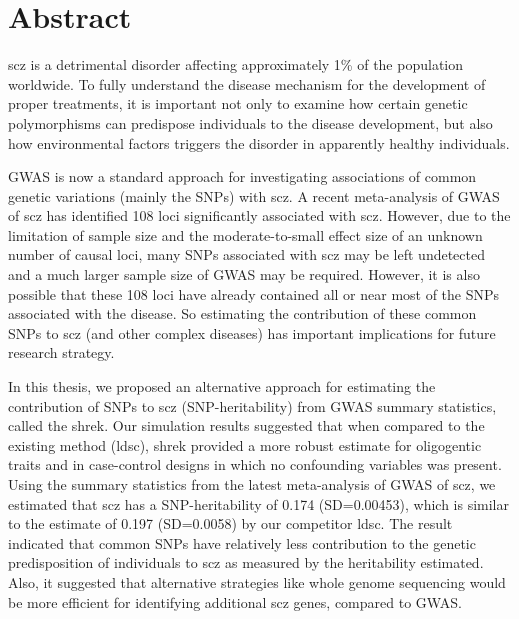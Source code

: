 \documentclass[12pt]{scrbook}
\begin{document}
	\chapter*{Abstract}
	\vspace{0.1cm}
	\Gls{scz} is a detrimental disorder affecting approximately 1\% of the population worldwide.
	To fully understand the disease mechanism for the development of proper treatments, it is important not only to examine how certain genetic polymorphisms can predispose individuals to the disease development, but also how environmental factors triggers the disorder in apparently healthy individuals. 
	
	\gls{GWAS} is now a standard approach for investigating associations of common genetic variations (mainly the \glspl{SNP}) with \gls{scz}. 
	A recent meta-analysis of \gls{GWAS} of \gls{scz} has identified 108 loci significantly associated with \gls{scz}. 
	However, due to the limitation of sample size and the moderate-to-small effect size of an unknown number of causal loci, many \glspl{SNP} associated with \gls{scz} may be left undetected and a much larger sample size of \gls{GWAS} may be required. 
	However, it is also possible that these 108 loci have already contained all or near most of the \glspl{SNP} associated with the disease. 
	So estimating the contribution of these common \glspl{SNP} to \gls{scz} (and other complex diseases) has important implications for future research strategy. 
	
	In this thesis, we proposed an alternative approach for estimating the contribution of \glspl{SNP} to \gls{scz} (\gls{SNP}-heritability) from \gls{GWAS} summary statistics, called the \gls{shrek}.
	Our simulation results suggested that when compared to the existing method (\gls{ldsc}), \gls{shrek} provided a more robust estimate for oligogentic traits and in case-control designs in which no confounding variables was present. 
	Using the summary statistics from the latest meta-analysis of \gls{GWAS} of \gls{scz}, we estimated that \gls{scz} has a \gls{SNP}-heritability of 0.174 (SD=0.00453), which is similar to the estimate of 0.197 (SD=0.0058) by our competitor \gls{ldsc}.
	The result indicated that common \glspl{SNP} have relatively less contribution to the genetic predisposition of individuals to \gls{scz} as measured by the heritability estimated. 
	Also, it suggested that alternative strategies like whole genome sequencing would be more efficient for identifying additional \gls{scz} genes, compared to \gls{GWAS}.
	
\end{document}
